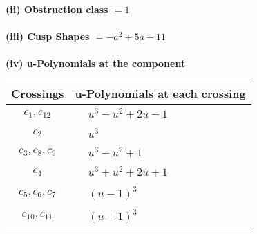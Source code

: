 \documentclass[1p]{elsarticle_modified}
\theoremstyle{definition}
\begin{document}
\flushleft \textbf{(ii) Obstruction class $= 1$}\\~\\
\flushleft \textbf{(iii) Cusp Shapes $= - a^2+5 a-11$}\\~\\
\newpage\renewcommand{\arraystretch}{1}
\flushleft \textbf{(iv) u-Polynomials at the component}\newline \\
\begin{tabular}{m{50pt}|m{274pt}}
Crossings & \hspace{64pt}u-Polynomials at each crossing \\
\hline $$\begin{aligned}c_{1},c_{12}\end{aligned}$$&$\begin{aligned}
&u^3- u^2+2 u-1
\end{aligned}$\\
\hline $$\begin{aligned}c_{2}\end{aligned}$$&$\begin{aligned}
&u^3
\end{aligned}$\\
\hline $$\begin{aligned}c_{3},c_{8},c_{9}\end{aligned}$$&$\begin{aligned}
&u^3- u^2+1
\end{aligned}$\\
\hline $$\begin{aligned}c_{4}\end{aligned}$$&$\begin{aligned}
&u^3+u^2+2 u+1
\end{aligned}$\\
\hline $$\begin{aligned}c_{5},c_{6},c_{7}\end{aligned}$$&$\begin{aligned}
&(u-1)^3
\end{aligned}$\\
\hline $$\begin{aligned}c_{10},c_{11}\end{aligned}$$&$\begin{aligned}
&(u+1)^3
\end{aligned}$\\
\hline
\end{tabular}\\~\\
\newpage\renewcommand{\arraystretch}{1}
\end{document}

